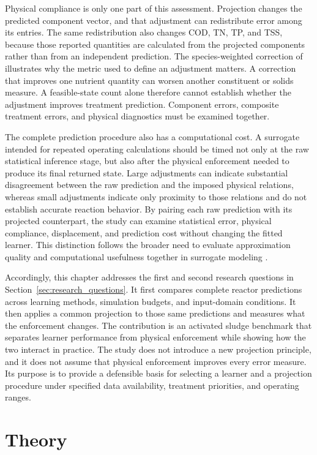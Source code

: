 Physical compliance is only one part of this assessment. Projection changes the predicted component vector, and that adjustment can redistribute error among its entries. The same redistribution also changes COD, TN, TP, and TSS, because those reported quantities are calculated from the projected components rather than from an independent prediction. The species-weighted correction of \citet{SturmSilva2024} illustrates why the metric used to define an adjustment matters. A correction that improves one nutrient quantity can worsen another constituent or solids measure. A feasible-state count alone therefore cannot establish whether the adjustment improves treatment prediction. Component errors, composite treatment errors, and physical diagnostics must be examined together.

The complete prediction procedure also has a computational cost. A surrogate intended for repeated operating calculations should be timed not only at the raw statistical inference stage, but also after the physical enforcement needed to produce its final returned state. Large adjustments can indicate substantial disagreement between the raw prediction and the imposed physical relations, whereas small adjustments indicate only proximity to those relations and do not establish accurate reaction behavior. By pairing each raw prediction with its projected counterpart, the study can examine statistical error, physical compliance, displacement, and prediction cost without changing the fitted learner. This distinction follows the broader need to evaluate approximation quality and computational usefulness together in surrogate modeling \citep{BhosekarIerapetritou2018}.

Accordingly, this chapter addresses the first and second research questions in Section~\ref{sec:research_questions}. It first compares complete reactor predictions across learning methods, simulation budgets, and input-domain conditions. It then applies a common projection to those same predictions and measures what the enforcement changes. The contribution is an activated sludge benchmark that separates learner performance from physical enforcement while showing how the two interact in practice. The study does not introduce a new projection principle, and it does not assume that physical enforcement improves every error measure. Its purpose is to provide a defensible basis for selecting a learner and a projection procedure under specified data availability, treatment priorities, and operating ranges.

\section{Theory}

